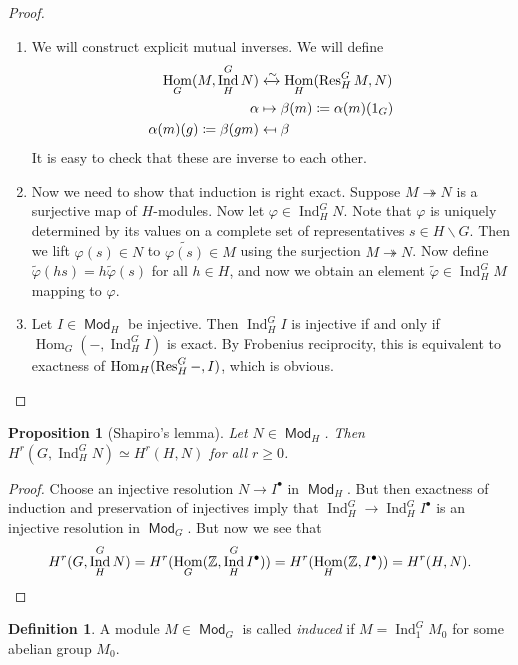 \documentclass[leqno, openany]{memoir}
\newtheorem{prop}[thm]{Proposition}
\theoremstyle{definition}
\newtheorem{defn}[thm]{Definition}
\theoremstyle{remark}
\theoremstyle{plain}
\theoremstyle{definition}
\theoremstyle{remark}
\newcommand{\Z}{\mathbb{Z}}
\newcommand{\wt}[1]{\widetilde{#1}}
\DeclareMathOperator{\Hom}{Hom}
\DeclareMathOperator{\Mod}{\mathsf{Mod}}
\DeclareMathOperator{\Ind}{Ind}
\begin{document}
\begin{proof}\leavevmode \begin{enumerate} \item We will construct explicit
    mutual inverses. We will define \begin{align*} \Hom_G(M, \Ind_H^G N)
    &\xleftrightarrow{\sim} \Hom_H(\Res_H^G M, N) \\ \alpha &\mapsto \beta(m)
    \coloneqq \alpha(m)(1_G) \\ \alpha(m)(g) \coloneqq \beta(gm) &\mapsfrom
\beta \end{align*} It is easy to check that these are inverse to each other.
\item Now we need to show that induction is right exact. Suppose $M
    \twoheadrightarrow N$ is a surjective map of $H$-modules. Now let $\varphi
    \in \Ind_H^G N$. Note that $\varphi$ is uniquely determined by its values
    on a complete set of representatives $s \in H \backslash G$. Then we lift
    $\varphi(s) \in N$ to $\wt{\varphi(s)} \in M$ using the surjection $M
    \twoheadrightarrow N$. Now define $\wt{\varphi}(hs) = h \wt{\varphi}(s)$
    for all $h \in H$, and now we obtain an element $\wt{\varphi} \in \Ind_H^G
    M$ mapping to $\varphi$.  \item Let $I \in \Mod_H$ be injective. Then
    $\Ind_H^G I$ is injective if and only if $\Hom_G(-, \Ind_H^G I)$ is exact.
    By Frobenius reciprocity, this is equivalent to exactness of
    $\Hom_H(\Res_H^G -, I)$, which is obvious. \qedhere \end{enumerate}
\end{proof}

\begin{prop}[Shapiro's lemma] Let $N \in \Mod_H$. Then $H^r(G, \Ind_H^G N)
\simeq H^r(H, N)$ for all $r \geq 0$.  \end{prop}

\begin{proof} Choose an injective resolution $N \to I^{\bullet}$ in $\Mod_H$.
    But then exactness of induction and preservation of injectives imply that
    $\Ind_H^G \to \Ind_H^G I^{\bullet}$ is an injective resolution in $\Mod_G$.
    But now we see that \[ H^r(G, \Ind_H^G N) = H^r(\Hom_G (\Z, \Ind_H^G
    I^{\bullet})) = H^r(\Hom_H(\Z, I^{\bullet})) = H^r(H, N). \qedhere \]
\end{proof}

\begin{defn} A module $M \in \Mod_G$ is called \textit{induced} if $M =
\Ind_1^G M_0$ for some abelian group $M_0$.  \end{defn}
\end{document}
